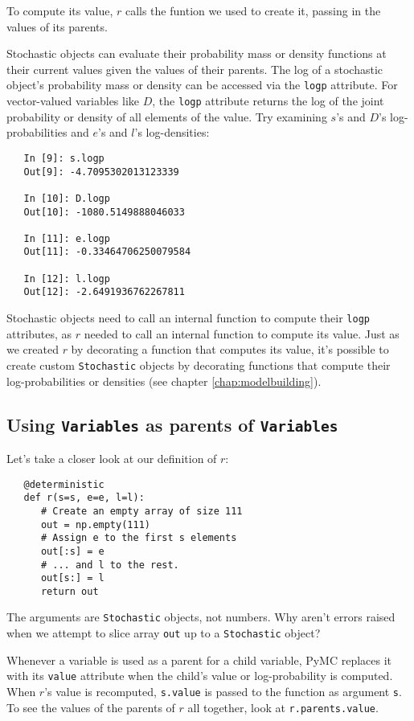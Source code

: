 To compute its value, $r$ calls the funtion we used to create it, passing in the values of its parents.

Stochastic objects can evaluate their probability mass or density functions at their current values given the values of their parents. The log of a stochastic object's probability mass or density can be accessed via the \texttt{logp} attribute. For vector-valued variables like $D$, the \texttt{logp} attribute returns the log of the joint probability or density of all elements of the value. Try examining $s$'s and $D$'s log-probabilities and $e$'s and $l$'s log-densities:
\begin{verbatim}
   In [9]: s.logp
   Out[9]: -4.7095302013123339

   In [10]: D.logp
   Out[10]: -1080.5149888046033

   In [11]: e.logp
   Out[11]: -0.33464706250079584

   In [12]: l.logp
   Out[12]: -2.6491936762267811
\end{verbatim}
Stochastic objects need to call an internal function to compute their \texttt{logp} attributes, as $r$ needed to call an internal function to compute its value. Just as we created $r$ by decorating a function that computes its value, it's possible to create custom \texttt{Stochastic} objects by decorating functions that compute their log-probabilities or densities (see chapter \ref{chap:modelbuilding}). 

\subsection*{Using \texttt{Variables} as parents of \texttt{Variables}}

Let's take a closer look at our definition of $r$:
\begin{verbatim}
   @deterministic
   def r(s=s, e=e, l=l):
      # Create an empty array of size 111
      out = np.empty(111)
      # Assign e to the first s elements
      out[:s] = e
      # ... and l to the rest.
      out[s:] = l
      return out
\end{verbatim}
The arguments are \texttt{Stochastic} objects, not numbers. Why aren't errors raised when we attempt to slice array \texttt{out} up to a \texttt{Stochastic} object?

Whenever a variable is used as a parent for a child variable, PyMC replaces it with its \texttt{value} attribute when the child's value or log-probability is computed. When $r$'s value is recomputed, \texttt{s.value} is passed to the function as argument \texttt{s}. To see the values of the parents of $r$ all together, look at \texttt{r.parents.value}.

